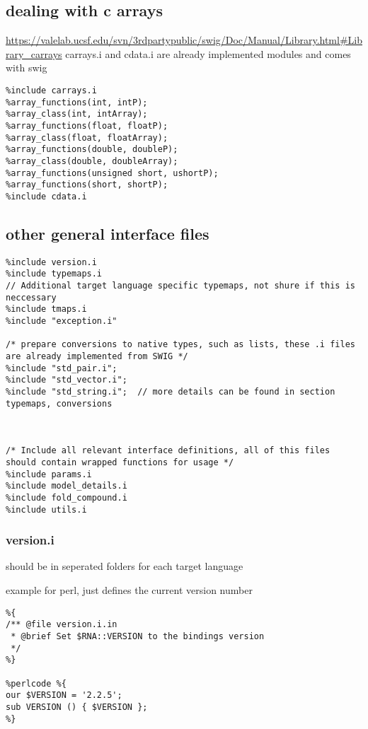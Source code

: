 \documentclass[ twoside,openright,titlepage,numbers=noenddot,headinclude,
                footinclude=true, cleardoublepage=empty,abstractoff, 
                BCOR=5mm,paper=a4,fontsize=11pt,
                ngerman,american,
                ]{scrreprt} %
\begin{document}
\subsection{dealing with c arrays}
\url{https://valelab.ucsf.edu/svn/3rdpartypublic/swig/Doc/Manual/Library.html#Library_carrays}
carrays.i and cdata.i are already implemented modules and comes with swig
\begin{lstlisting}
%include carrays.i
%array_functions(int, intP);
%array_class(int, intArray);
%array_functions(float, floatP);
%array_class(float, floatArray);
%array_functions(double, doubleP);
%array_class(double, doubleArray);
%array_functions(unsigned short, ushortP);
%array_functions(short, shortP);
%include cdata.i
\end{lstlisting}

\subsection{other general interface files}
\begin{lstlisting}
%include version.i
%include typemaps.i
// Additional target language specific typemaps, not shure if this is neccessary
%include tmaps.i
%include "exception.i"

/* prepare conversions to native types, such as lists, these .i files are already implemented from SWIG */
%include "std_pair.i";   
%include "std_vector.i";
%include "std_string.i";  // more details can be found in section typemaps, conversions



/* Include all relevant interface definitions, all of this files should contain wrapped functions for usage */
%include params.i
%include model_details.i
%include fold_compound.i
%include utils.i

\end{lstlisting}
\subsubsection{version.i}
should be in seperated folders for each target language

example for perl, just defines the current version number
\begin{lstlisting}
%{
/** @file version.i.in
 * @brief Set $RNA::VERSION to the bindings version
 */
%}

%perlcode %{
our $VERSION = '2.2.5';
sub VERSION () { $VERSION };
%}
\end{lstlisting}
\end{document}
